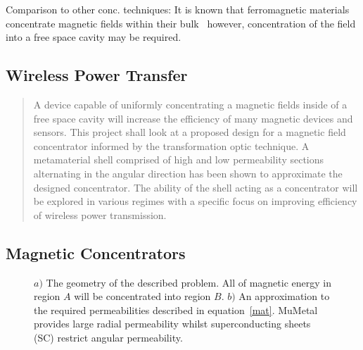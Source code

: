\documentclass[11pt]{iopart}
\begin{document}
Comparison to other conc. techniques:
It is known that ferromagnetic materials concentrate magnetic fields
within their bulk~\cite{ferro} however, concentration of the field
into a free space cavity may be required.

\subsection{Wireless Power Transfer}

\begin{abstract}

A device capable of uniformly concentrating a magnetic fields inside of
a free space cavity will increase the efficiency of many magnetic
devices and sensors.  This project shall look at a proposed design for
a magnetic field concentrator informed by the transformation optic
technique. A metamaterial shell comprised of high and low permeability
sections alternating in the angular direction has been shown to
approximate the designed concentrator\cite{N2014}. The ability of the shell acting
as a concentrator will be explored in various regimes with a specific
focus on improving efficiency of wireless power transmission.

\end{abstract}

\subsection*{Magnetic Concentrators}
\begin{figure}[!tb] \centering
  \caption{\label{conc} $a)$ The geometry of the described problem. All of magnetic energy in region $A$ will be concentrated into region $B$. $b)$ An approximation to the required permeabilities described in equation~\ref{mat}. MuMetal provides large radial permeability whilst superconducting sheets (SC) restrict angular permeability.}
\end{figure}
\end{document}
